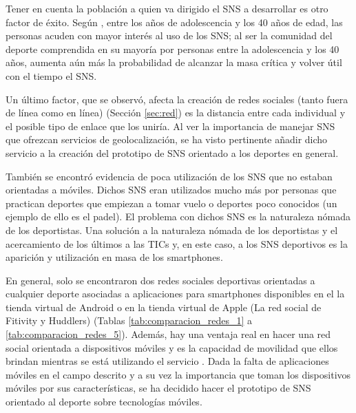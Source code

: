 Tener en cuenta la población a quien va dirigido el SNS a desarrollar es otro factor de éxito. Según \cite{user_behavior_online}, entre los años de adolescencia y los 40 años de edad, las personas acuden con mayor interés al uso de los SNS; al ser la comunidad del deporte comprendida en su mayoría por personas entre la adolescencia y los 40 años, aumenta aún más la probabilidad de alcanzar la masa crítica y volver útil con el tiempo el SNS.

Un último factor, que se observó, afecta la creación de redes sociales (tanto fuera de línea como en línea) (Sección \ref{sec:red}) es la distancia entre cada individual y el posible tipo de enlace que los uniría. Al ver la importancia de manejar SNS que ofrezcan servicios de geolocalización, se ha visto pertinente añadir dicho servicio a la creación del prototipo de SNS orientado a los deportes en general.

También se encontró evidencia de poca utilización de los SNS que no estaban orientadas a móviles. Dichos SNS eran utilizados mucho más por personas
que practican deportes que empiezan a tomar vuelo o deportes poco conocidos (un ejemplo de ello es el padel). El problema con dichos SNS es la
naturaleza nómada de los deportistas. Una solución a la naturaleza nómada de los deportistas y el acercamiento de los últimos a las TICs y, en este caso, a
los SNS deportivos es la aparición y utilización en masa de los smartphones.

En general, solo se encontraron dos redes sociales deportivas orientadas a cualquier deporte asociadas a aplicaciones para smartphones disponibles en el la tienda virtual de Android o en la tienda virtual de Apple (La red social de Fitivity y Huddlers) (Tablas \ref{tab:comparacion_redes_1} a \ref{tab:comparacion_redes_5}). Además, hay una ventaja real en hacer una red social orientada a dispositivos móviles y es la capacidad de movilidad que ellos brindan mientras se está utilizando el servicio \cite{spiderweb}. Dada la falta de aplicaciones móviles en el campo descrito y a su vez la importancia que toman los dispositivos móviles por sus características, se ha decidido hacer el prototipo de SNS orientado al deporte sobre tecnologías móviles.
